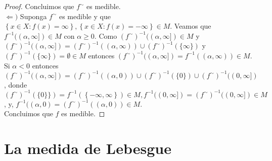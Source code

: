 \documentclass[spanish,12pt,a4paper,openany]{book}
\begin{document}
\begin{enumerate}
\begin{proof}
			Concluimos que $f^{\sim}$ es medible.\\
			
			$\Leftarrow )$ Suponga $f^{\sim}$ es medible y que $\left\{x \in X : f(x) = \infty \right\} , \left\{x \in X : f (x) = - \infty \right\} \in M$. Veamos que $f^{-1}((\alpha, \infty]) \in M$ con $\alpha \geq 0$.  Como $(f^{\sim}) ^{-1} ((\alpha , \infty]) \in M $ y $(f^{\sim}) ^{-1} ((\alpha , \infty]) = (f^{\sim}) ^{-1} ((\alpha , \infty)) \cup (f^{\sim}) ^{-1} (\{ \infty \})$ y $(f^{\sim}) ^{-1} (\{ \infty \}) = \emptyset \in M$ entonces $(f^{\sim}) ^{-1} ((\alpha , \infty]) = f^{-1} ((\alpha , \infty)) \in M$.\\
			
			Si $\alpha < 0$ entonces $(f^{\sim}) ^{-1} ((\alpha , \infty]) = (f^{\sim}) ^{-1} ((\alpha , 0)) \cup (f^{\sim}) ^{-1} ( \{ 0 \} ) \cup (f^{\sim}) ^{-1} ((0, \infty])$, donde $(f^{\sim}) ^{-1} ( \{ 0 \} \}) = f^{-1}(\left\{- \infty, \infty \right\}) \in M, f ^{-1} ((0, \infty]) = (f^{\sim}) ^{-1} ((0, \infty]) \in M $, y,  $f^{-1} ((\alpha, 0) = (f^{\sim})^{-1} ((\alpha, 0)) \in M$.\\
			
			Concluimos que $f$ es medible.
		\end{proof}
	\end{enumerate}
	\chapter{La medida de Lebesgue}
\end{document}
